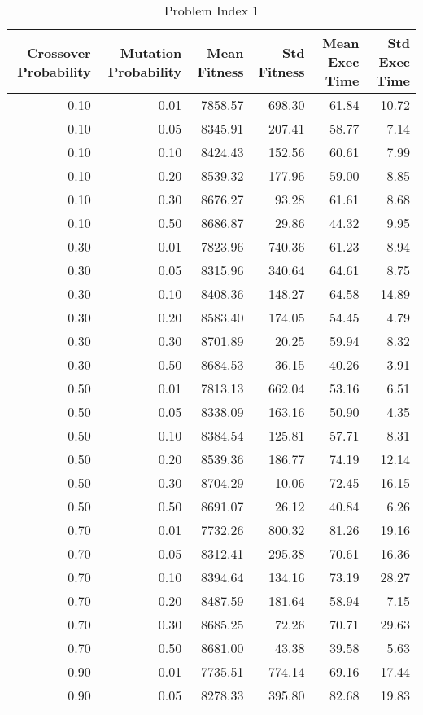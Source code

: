 \begin{table}
\caption{Problem Index 1}
\label{tab:problem_1}
\begin{tabular}{rrrrrr}
\toprule
Crossover Probability & Mutation Probability & Mean Fitness & Std Fitness & Mean Exec Time & Std Exec Time \\
\midrule
0.10 & 0.01 & 7858.57 & 698.30 & 61.84 & 10.72 \\
0.10 & 0.05 & 8345.91 & 207.41 & 58.77 & 7.14 \\
0.10 & 0.10 & 8424.43 & 152.56 & 60.61 & 7.99 \\
0.10 & 0.20 & 8539.32 & 177.96 & 59.00 & 8.85 \\
0.10 & 0.30 & 8676.27 & 93.28 & 61.61 & 8.68 \\
0.10 & 0.50 & 8686.87 & 29.86 & 44.32 & 9.95 \\
0.30 & 0.01 & 7823.96 & 740.36 & 61.23 & 8.94 \\
0.30 & 0.05 & 8315.96 & 340.64 & 64.61 & 8.75 \\
0.30 & 0.10 & 8408.36 & 148.27 & 64.58 & 14.89 \\
0.30 & 0.20 & 8583.40 & 174.05 & 54.45 & 4.79 \\
0.30 & 0.30 & 8701.89 & 20.25 & 59.94 & 8.32 \\
0.30 & 0.50 & 8684.53 & 36.15 & 40.26 & 3.91 \\
0.50 & 0.01 & 7813.13 & 662.04 & 53.16 & 6.51 \\
0.50 & 0.05 & 8338.09 & 163.16 & 50.90 & 4.35 \\
0.50 & 0.10 & 8384.54 & 125.81 & 57.71 & 8.31 \\
0.50 & 0.20 & 8539.36 & 186.77 & 74.19 & 12.14 \\
0.50 & 0.30 & 8704.29 & 10.06 & 72.45 & 16.15 \\
0.50 & 0.50 & 8691.07 & 26.12 & 40.84 & 6.26 \\
0.70 & 0.01 & 7732.26 & 800.32 & 81.26 & 19.16 \\
0.70 & 0.05 & 8312.41 & 295.38 & 70.61 & 16.36 \\
0.70 & 0.10 & 8394.64 & 134.16 & 73.19 & 28.27 \\
0.70 & 0.20 & 8487.59 & 181.64 & 58.94 & 7.15 \\
0.70 & 0.30 & 8685.25 & 72.26 & 70.71 & 29.63 \\
0.70 & 0.50 & 8681.00 & 43.38 & 39.58 & 5.63 \\
0.90 & 0.01 & 7735.51 & 774.14 & 69.16 & 17.44 \\
0.90 & 0.05 & 8278.33 & 395.80 & 82.68 & 19.83 \\

\end{tabular}
\end{table}
